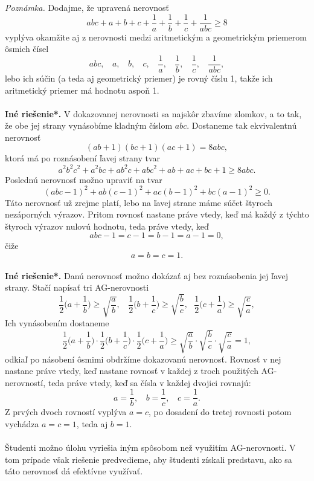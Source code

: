 {\textit{Poznámka.} Dodajme, že upravená nerovnosť
$$abc + a + b + c +\frac{1}{a}+\frac{1}{b}+\frac{1}{c}+\frac{1}{abc}\geq8$$
vyplýva okamžite aj z nerovnosti medzi aritmetickým a geometrickým priemerom ôsmich čísel
$$abc, \ \ \ \ a, \ \ \ \  b, \ \ \ \  c, \ \ \ \  \frac{1}{a}, \ \ \ \  \frac{1}{b}, \ \ \ \  \frac{1}{c},  \ \ \ \ \frac{1}{abc},$$
lebo ich súčin (a teda aj geometrický priemer) je rovný číslu 1, takže ich aritmetický priemer má hodnotu aspoň 1.\\
\\
\textbf{Iné riešenie*.} V dokazovanej nerovnosti sa najskôr zbavíme zlomkov, a to tak, že obe jej strany vynásobíme kladným číslom $abc$. Dostaneme tak ekvivalentnú nerovnosť
$$(ab + 1)(bc + 1)(ac + 1) = 8abc,$$
ktorá má po roznásobení ľavej strany tvar
$$a^2b^2c^2 + a^2bc + ab^2c + abc^2 + ab + ac + bc + 1 \geq 8abc.$$
Poslednú nerovnosť možno upraviť na tvar
$$(abc -1)^2 + ab(c - 1)^2 + ac(b - 1)^2 + bc(a - 1)^2 \geq 0.$$
Táto nerovnosť už zrejme platí, lebo na ľavej strane máme súčet štyroch nezáporných výrazov. Pritom rovnosť nastane práve vtedy, keď má každý z týchto štyroch výrazov nulovú hodnotu, teda práve vtedy, keď
$$abc - 1 = c -1 = b - 1 = a - 1 = 0,$$
čiže $$a = b = c = 1.$$
\\
\textbf{Iné riešenie*.} Danú nerovnosť možno dokázať aj bez roznásobenia jej ľavej strany. Stačí napísať tri AG-nerovnosti
$$\frac{1}{2}\bigg(a+\frac{1}{b} \bigg)\geq \sqrt{\frac{a}{b}}, \ \ \ \ \frac{1}{2}\bigg(b+\frac{1}{c} \bigg)\geq \sqrt{\frac{b}{c}}, \ \ \ \frac{1}{2}\bigg(c+\frac{1}{a} \bigg)\geq \sqrt{\frac{c}{a}},  $$
Ich vynásobením dostaneme
$$\frac{1}{2}\bigg(a+\frac{1}{b} \bigg)\cdot\frac{1}{2}\bigg(b+\frac{1}{c} \bigg)\cdot \frac{1}{2}\bigg(c+\frac{1}{a} \bigg)\geq \sqrt{\frac{a}{b}} \cdot \sqrt{\frac{b}{c}}\cdot \sqrt{\frac{c}{a}} =1, $$
odkiaľ po násobení ôsmimi obdržíme dokazovanú nerovnosť. Rovnosť v nej nastane práve vtedy, keď nastane rovnosť v každej z troch použitých AG-nerovností, teda práve vtedy, keď sa čísla v každej  dvojici rovnajú:
$$a =\frac{1}{b}, \ \ \ \  b =\frac{1}{c}, \ \ \ \  c =\frac{1}{a}.$$
Z prvých dvoch rovností vyplýva $a = c$, po dosadení do tretej rovnosti potom vychádza $a = c = 1$, teda aj $b = 1$.
\\
\\
\kom Študenti možno úlohu vyriešia iným spôsobom než využitím AG-nerovnosti. V tom prípade však riešenie predvedieme, aby študenti získali predstavu, ako sa táto nerovnosť dá efektívne využívať.\\
\\
}
